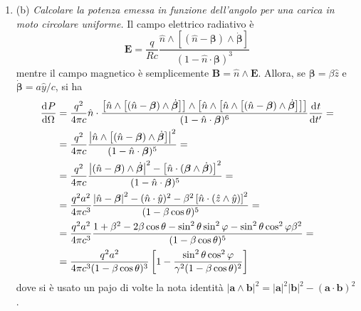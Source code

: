 \documentclass{article}
\renewcommand{\b}{(b)}
\renewcommand{\t}[1]{\textit{ #1}}
\renewcommand{\vec}[1]{\mathbf{#1}}
\begin{document}
\begin{enumerate}
{		armonicamente in linea retta (termine di dipolo elettrico).}
	Come noto, il potenziale vettore dovuto al dipolo elettrico $\vec{p}$ è
	\[\vec{A}=\frac{\dot{\vec{p}}}{cr}\]
	La distribuzione angolare di potenza è allora
	\[\der{P}{\Omega}=\frac{cr^2}{4\pi}|(\nabla\wedge\vec{A})_\textrm{rad}|^2\]
	dove il pedice rad sta ad indicare che nel calcolo del rotore si devono tenere solamente i termini che decrescono come $r^{-1}$. Nel nostro caso
	\[(\nabla\wedge\vec{A})_\textrm{rad}=\frac{\ddot{\vec{p}}\wedge\hat{r}}{c^2r}\]
	Posto $\vec{p}=\vec{p}_0e^{-i\omega t}$ e indicando con $\theta$ l'angolo tra $\hat{r}$ e $\vec{p}_0$ si ottiene infine
	\[\der{P}{\Omega}=\frac{p_0^2\omega^4}{4\pi c^3}\sin^2\theta\]
	\item\b\t{Calcolare la potenza emessa in funzione dell’angolo per una carica in moto
		circolare uniforme.}
	Il campo elettrico radiativo è
	\[\vec{E}=\frac{q}{Rc}\frac{\hat{n}\wedge[(\hat{n}-\bm{\beta})\wedge\dot{\bm{\beta}}]}{(1-\hat{n}\cdot\bm{\beta})^3}\]
	mentre il campo magnetico è semplicemente $\vec{B}=\hat{n}\wedge\vec{E}$. Allora, se $\bm{\beta}=\beta\hat{z}$ e $\dot{\bm{\beta}}=a\hat{y}/c$, si ha
	\begin{align*}
		\dfrac{\mathrm{d} ^{}P}{\mathrm{d} {\Omega}^{}}&=\frac{q^2}{4\pi c}\hat{n}\cdot\frac{\left[\hat{n}\wedge\left[(\hat{n}-\bm{\beta})\wedge\dot{\bm{\beta}}\right]\right]\wedge\left[\hat{n}\wedge\left[\hat{n}\wedge\left[(\hat{n}-\bm{\beta})\wedge\dot{\bm{\beta}}\right]\right]\right]}{(1-\hat{n}\cdot\bm{\beta})^6}\dfrac{\mathrm{d} ^{}t}{\mathrm{d} {t'}^{}}=\\&=\frac{q^2}{4\pi c}\frac{\left|\hat{n}\wedge\left[(\hat{n}-\bm{\beta})\wedge\dot{\bm{\beta}}\right]\right|^2}{(1-\hat{n}\cdot\bm{\beta})^5}=\\&=\frac{q^2}{4\pi c}\frac{\left|(\hat{n}-\bm{\beta})\wedge\dot{\bm{\beta}}\right|^2-\left[\hat{n}\cdot(\bm{\beta}\wedge\dot{\bm{\beta}})\right]^2}{(1-\hat{n}\cdot\bm{\beta})^5}=\\&=\frac{q^2a^2}{4\pi c^3}\frac{\left|\hat{n}-\bm\beta\right|^2-(\hat{n}\cdot\hat{y})^2-\beta^2\left[\hat{n}\cdot(\hat{z}\wedge\hat{y})\right]^2}{(1-\beta\cos\theta)^5}=\\&=\frac{q^2a^2}{4\pi c^3}\frac{1+\beta^2-2\beta\cos\theta-\sin^2\theta\sin^2\varphi-\sin^2\theta\cos^2\varphi\beta^2}{(1-\beta\cos\theta)^5}=\\&=\frac{q^2a^2}{4\pi c^3(1-\beta\cos\theta)^3}\left[1-\frac{\sin^2\theta\cos^2\varphi}{\gamma^2(1-\beta\cos\theta)^2}\right]
	\end{align*}
	dove si è usato un pajo di volte la nota identità $|\vec{a}\wedge\vec{b}|^2=|\vec{a}|^2|\vec{b}|^2-(\vec{a}\cdot\vec{b})^2$.

\end{enumerate}
\end{document}

